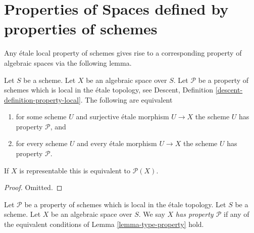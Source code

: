 \section{Properties of Spaces defined by properties of schemes}
\label{section-types-properties}

\noindent
Any \'etale local property of schemes gives rise to a corresponding
property of algebraic spaces via the following lemma.

\begin{lemma}
\label{lemma-type-property}
Let $S$ be a scheme.
Let $X$ be an algebraic space over $S$.
Let $\mathcal{P}$ be a property of schemes which is local in the \'etale
topology, see
Descent, Definition \ref{descent-definition-property-local}.
The following are equivalent
\begin{enumerate}
\item for some scheme $U$ and surjective \'etale morphism $U \to X$
the scheme $U$ has property $\mathcal{P}$, and
\item for every scheme $U$ and every \'etale morphism $U \to X$
the scheme $U$ has property $\mathcal{P}$.
\end{enumerate}
If $X$ is representable this is equivalent to $\mathcal{P}(X)$.
\end{lemma}

\begin{proof}
Omitted.
\end{proof}

\begin{definition}
\label{definition-type-property}
Let $\mathcal{P}$ be a property of schemes which is
local in the \'etale topology.
Let $S$ be a scheme.
Let $X$ be an algebraic space over $S$.
We say $X$ {\it has property $\mathcal{P}$}
if any of the equivalent conditions of
Lemma \ref{lemma-type-property}
hold.
\end{definition}

